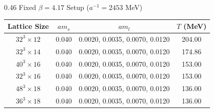 \documentclass[10pt, aspectratio=169]{beamer} %
\begin{document}
\begin{frame}
\begin{columns}[T]
    \begin{column}{0.46\textwidth}
        \setlength{\leftskip}{0pt}
        \centering
        {\footnotesize Fixed $\beta = 4.17$ Setup ($a^{-1} = 2453$ MeV)} \\
        \vspace{0.2em}
        \tiny
        \renewcommand{\arraystretch}{1.12}
        \setlength{\tabcolsep}{2.5pt}
        \begin{tabular}{cccc}
            \toprule
            Lattice Size & $am_s$ & $am_l$ & $T$ (MeV) \\
            \midrule
            $32^3 \times 12$ & 0.040 & 0.0020, 0.0035, 0.0070, 0.0120 & 204.00 \\
            $32^3 \times 14$ & 0.040 & 0.0020, 0.0035, 0.0070, 0.0120 & 174.86 \\
            $40^3 \times 16$ & 0.040 & 0.0020, 0.0035, 0.0070, 0.0120 & 153.00 \\
            $32^3 \times 16$ & 0.040 & 0.0020, 0.0035, 0.0070, 0.0120 & 153.00 \\
            $48^3 \times 18$ & 0.040 & 0.0020, 0.0035, 0.0070, 0.0120 & 136.00 \\
            $36^3 \times 18$ & 0.040 & 0.0020, 0.0035, 0.0070, 0.0120 & 136.00 \\
            \bottomrule
        \end{tabular}
    \end{column}
\end{columns}
\vfill
\end{frame}
\end{document}
